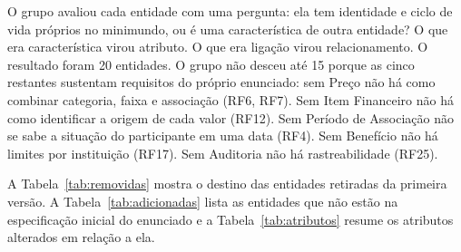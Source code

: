 O grupo avaliou cada entidade com uma pergunta: ela tem identidade e ciclo de vida próprios no minimundo, ou é uma característica de outra entidade? O que era característica virou atributo. O que era ligação virou relacionamento. O resultado foram 20 entidades. O grupo não desceu até 15 porque as cinco restantes sustentam requisitos do próprio enunciado: sem Preço não há como combinar categoria, faixa e associação (RF6, RF7). Sem Item Financeiro não há como identificar a origem de cada valor (RF12). Sem Período de Associação não se sabe a situação do participante em uma data (RF4). Sem Benefício não há limites por instituição (RF17). Sem Auditoria não há rastreabilidade (RF25).

A Tabela~\ref{tab:removidas} mostra o destino das entidades retiradas da primeira versão. A Tabela~\ref{tab:adicionadas} lista as entidades que não estão na especificação inicial do enunciado e a Tabela~\ref{tab:atributos} resume os atributos alterados em relação a ela.

